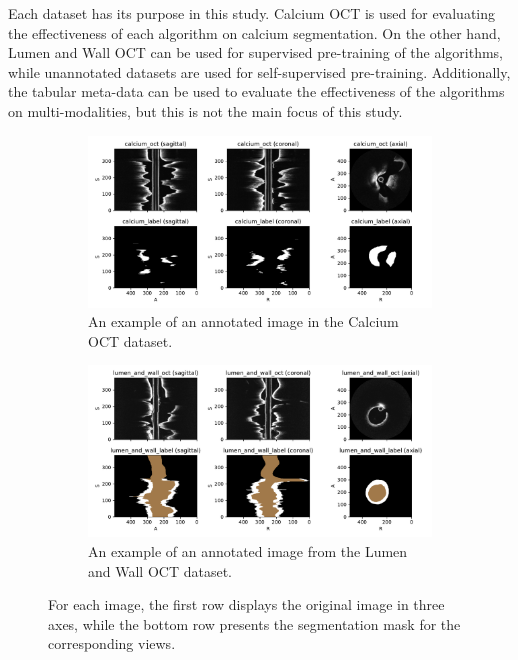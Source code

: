 \documentclass[a4paper,11pt,oneside]{report}
\begin{document}
Each dataset has its purpose in this study. Calcium OCT is used for evaluating the effectiveness of each algorithm on calcium segmentation. On the other hand, Lumen and Wall OCT can be used for supervised pre-training of the algorithms, while unannotated datasets are used for self-supervised pre-training. Additionally, the tabular meta-data can be used to evaluate the effectiveness of the algorithms on multi-modalities, but this is not the main focus of this study.

\begin{figure}[hbt]
    \begin{subfigure}[t]{0.49\textwidth}
        \centering
        \includegraphics[width=1\linewidth]{figures/fig_datasets_calcium_oct_sample.pdf}
        \caption{An example of an annotated image in the Calcium OCT dataset.}
        \label{fig:calcium-oct}
    \end{subfigure}%
    \hfill
    \begin{subfigure}[t]{0.49\textwidth}
        \centering
        \includegraphics[width=1\linewidth]{figures/fig_datasets_law_oct_sample.pdf}
        \caption{An example of an annotated image from the Lumen and Wall OCT dataset.}
        \label{fig:lumen-and-wall-oct}
    \end{subfigure}
    \caption{For each image, the first row displays the original image in three axes, while the bottom row presents the segmentation mask for the corresponding views.}
    \label{fig:enter-label}
\end{figure}
\end{document}
